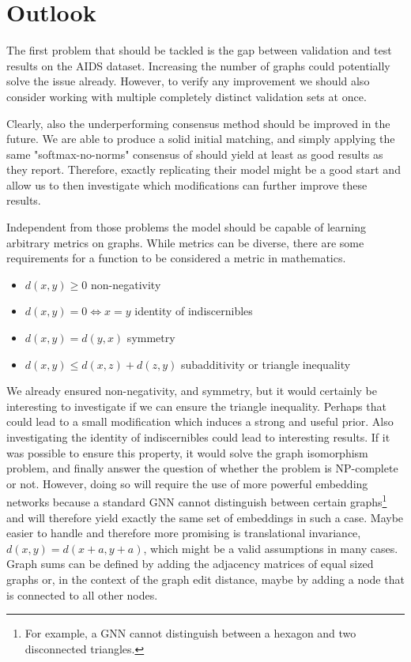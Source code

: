 \section{Outlook}

The first problem that should be tackled is the gap between validation and test results on the AIDS dataset. Increasing the number of graphs could potentially solve the issue already. However, to verify any improvement we should also consider working with multiple completely distinct validation sets at once.

Clearly, also the underperforming consensus method should be improved in the future. We are able to produce a solid initial matching, and simply applying the same "softmax-no-norms" consensus of \cite{fey2020_update} should yield at least as good results as they report. Therefore, exactly replicating their model might be a good start and allow us to then investigate which modifications can further improve these results.

Independent from those problems the model should be capable of learning arbitrary metrics on graphs. While metrics can be diverse, there are some requirements for a function to be considered a metric in mathematics.
\begin{itemize}
    \itemsep0em
    \item $d(x,y) \ge 0$ non-negativity
    \item $d(x,y) = 0 \Leftrightarrow x = y$ identity of indiscernibles
    \item $d(x,y)  = d(y,x)$ symmetry
    \item $d(x,y) \le d(x,z) + d(z, y)$ subadditivity or triangle inequality
\end{itemize}
We already ensured non-negativity, and symmetry, but it would certainly be interesting to investigate if we can ensure the triangle inequality. Perhaps that could lead to a small modification which induces a strong and useful prior. Also investigating the identity of indiscernibles could lead to interesting results. If it was possible to ensure this property, it would solve the graph isomorphism problem, and finally answer the question of whether the problem is NP-complete or not. However, doing so will require the use of more powerful embedding networks because a standard GNN cannot distinguish between certain graphs\footnote{For example, a GNN cannot distinguish between a hexagon and two disconnected triangles.} and will therefore yield exactly the same set of embeddings in such a case. Maybe easier to handle and therefore more promising is translational invariance, $d(x,y) = d(x+a,y+a)$, which might be a valid assumptions in many cases. Graph sums can be defined by adding the adjacency matrices of equal sized graphs \cite{graph_sum2004} or, in the context of the graph edit distance, maybe by adding a node that is connected to all other nodes.

